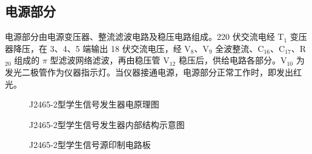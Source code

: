 \documentclass[12pt,UTF8]{ctexbook}
\begin{document}
	\subsection{电源部分}
	电源部分由电源变压器、整流滤波电路及稳压电路组成。220 伏交流电经 T\(_1\) 变压器降压，在 3、4、5 端输出 18 伏交流电压，经 V\(_8\)、V\(_9\) 全波整流、C\(_{16}\)、C\(_{17}\)、R\(_{20}\) 组成的 \(\pi\) 型滤波网络滤波，再由稳压管 V\(_{12}\) 稳压后，供给电路各部分。V\(_{10}\) 为发光二极管作为仪器指示灯。当仪器接通电源，电源部分正常工作时，即发出红光。
	
	\begin{figure}[H]
		\centering
		\caption{J2465-2型学生信号发生器电原理图}
		\label{fig:schematic}
	\end{figure}
	
	\begin{figure}[H]
		\centering
		\caption{J2465-2型学生信号发生器内部结构示意图}
		\label{fig:structure}
	\end{figure}
	
	\begin{figure}[H]
		\centering
		\caption{J2465-2型学生信号源印制电路板}
		\label{fig:pcb}
	\end{figure}
	
\end{document}

